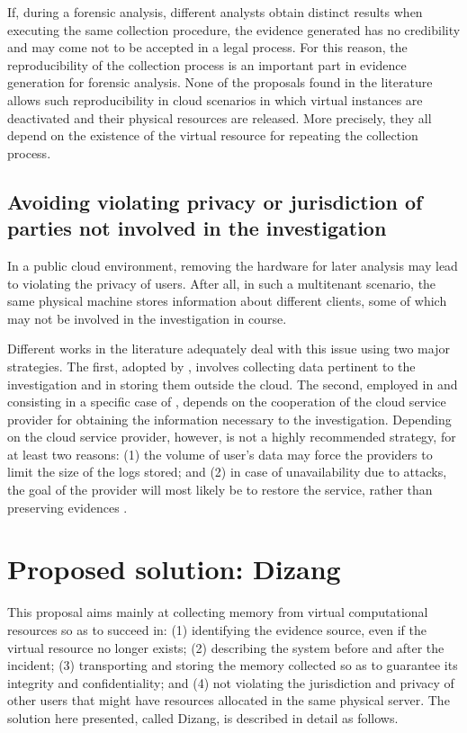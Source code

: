 \documentclass[conference]{IEEEtran}
\newcommand{\fancyname}{Dizang }
\begin{document}
If, during a forensic analysis, different analysts obtain distinct results when executing the same collection procedure, the evidence generated has no credibility and may come not to be accepted in a legal process. 
%
For this reason, the reproducibility of the collection process is an important part in evidence generation for forensic analysis.
%
None of the proposals found in the literature allows such reproducibility in cloud scenarios in which virtual instances are deactivated and their physical resources are released.
%
More precisely, they all depend on the existence of the virtual resource for repeating the collection process.


\subsection{Avoiding violating privacy or jurisdiction of parties not involved in the investigation}

In a public cloud environment, removing the hardware for later analysis may lead to violating the privacy of users.
%
After all, in such a multitenant scenario, the same physical machine stores information about different clients, some of which may not be involved in the investigation in course.


Different works in the literature adequately deal with this issue using two major strategies.
%
The first, adopted by \cite{Reichert_Auto_acquisition:2015,George_DF2CE:2012,Poisel_VMI:2013,Dykstra_FROST:2013}, involves collecting data pertinent to the investigation and in storing them outside the cloud.
%
The second, employed in \cite{Sang_Log_approach:2013} and consisting in a specific case of \cite{George_DF2CE:2012}, depends on the cooperation of the cloud service provider for obtaining the information necessary to the investigation. 
%
Depending on the cloud service provider, however, is not a highly recommended strategy, for at least two reasons: 
(1) the volume of user's data may force the providers to limit the size of the logs stored; and 
(2) in case of unavailability due to attacks, the goal of the provider will most likely be to restore the service, rather than preserving evidences \cite{Clarke_Review_of_Challenges:2015}. 


\section{Proposed solution: \fancyname}
\label{sec:proposal}

This proposal aims mainly at collecting memory from virtual computational resources so as to succeed in: 
(1) identifying the evidence source, even if the virtual resource no longer exists; 
(2) describing the system before and after the incident;
(3) transporting and storing the memory collected so as to guarantee its integrity and confidentiality; and
(4) not violating the jurisdiction and privacy of other users that might have resources allocated in the same physical server.
%
The solution here presented, called Dizang, is described in detail as follows.
\end{document}
